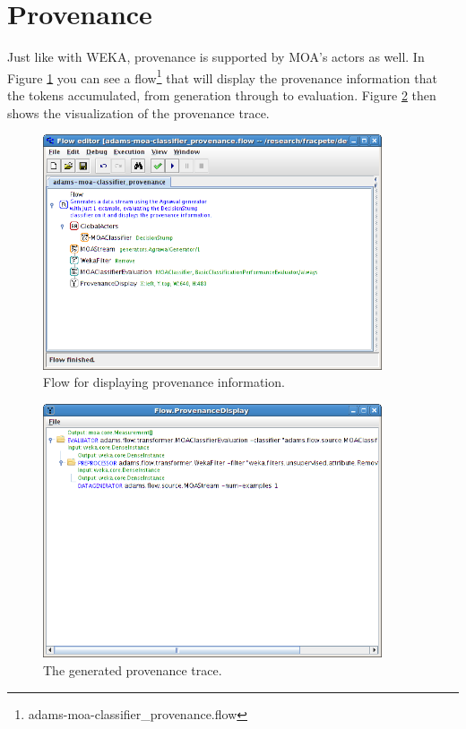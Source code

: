 \documentclass[a4paper]{book}
\begin{document}
\clearpage
\newpage
\section{Provenance}
Just like with WEKA, provenance is supported by MOA's actors as well.
In Figure \ref{provenance-flow} you can see a 
flow\footnote{adams-moa-classifier\_provenance.flow} that will display the
provenance information that the tokens accumulated, from generation through 
to evaluation. Figure \ref{provenance-output} then shows the visualization
of the provenance trace.

\begin{figure}[htb]
  \centering
  \includegraphics[width=10.0cm]{images/provenance-flow.png}
  \caption{Flow for displaying provenance information.}
  \label{provenance-flow}
\end{figure}

\begin{figure}[htb]
  \centering
  \includegraphics[width=10.0cm]{images/provenance-output.png}
  \caption{The generated provenance trace.}
  \label{provenance-output}
\end{figure}
\end{document}
